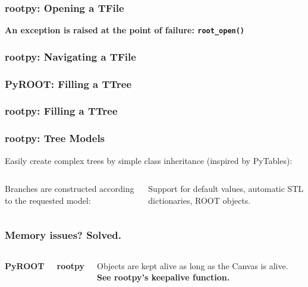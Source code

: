 \documentclass[10pt,professionalfonts,serif,usenames,dvipsnames,svgnames,table]{beamer}
\begin{document}
\begin{frame}[fragile]
    \frametitle{rootpy: Opening a TFile}

    
    \vspace{-.5cm}
    
    \begin{center}
        \vspace{-.5cm}
    {\bf An exception is raised at the point of failure:
    \verb|root_open()|}
    \end{center}
\end{frame}

\begin{frame}[fragile]
    \frametitle{rootpy: Navigating a TFile}
    
    \vspace{-.5cm}
    
\end{frame}

\begin{frame}[fragile]
    \frametitle{PyROOT: Filling a TTree}
    
\end{frame}

\begin{frame}[fragile]
    \frametitle{rootpy: Filling a TTree}
    
\end{frame}

\begin{frame}[fragile]
    \frametitle{rootpy: Tree Models}
    Easily create complex trees by simple class inheritance (inspired by
    PyTables):
    \vspace{-.6cm}
    \begin{columns}
    

    \vspace{.8cm}

    Branches are constructed according to the requested model:
    
    \vspace{-.3cm}
    Support for default values, automatic STL dictionaries, ROOT objects.
    \end{columns}
\end{frame}

\begin{frame}[fragile]
    \frametitle{Memory issues? Solved.}
    \begin{columns}
        {\bf PyROOT}
    
        {\bf rootpy}
    
    Objects are kept alive as long as the Canvas is alive. \\
    {\bf See rootpy's keepalive function.}
    \end{columns}
\end{frame}
\end{document}
